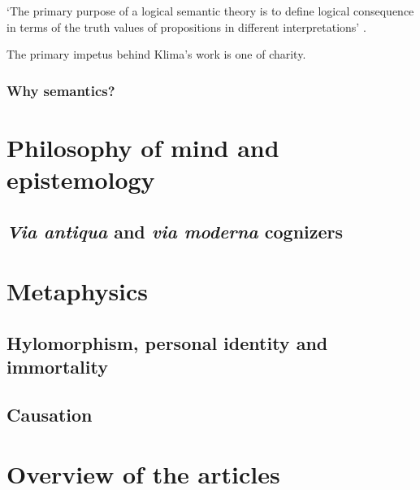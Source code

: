 \documentclass[]{article}
\begin{document}
\autocite{Parsons2014,Read2015b}

`The primary purpose of a logical semantic theory is to define logical consequence in terms of the truth values of propositions in different interpretations' \autocite[79]{Klima1991b}. 

The primary impetus behind Klima's work is one of charity.

\subsubsection{Why semantics?}


\section{Philosophy of mind and epistemology}
\subsection{\textit{Via antiqua} and \textit{via moderna} cognizers}
\section{Metaphysics}
\subsection{Hylomorphism, personal identity and immortality}
\subsection{Causation}
\section{Overview of the articles}

\printbibliography
\end{document}
